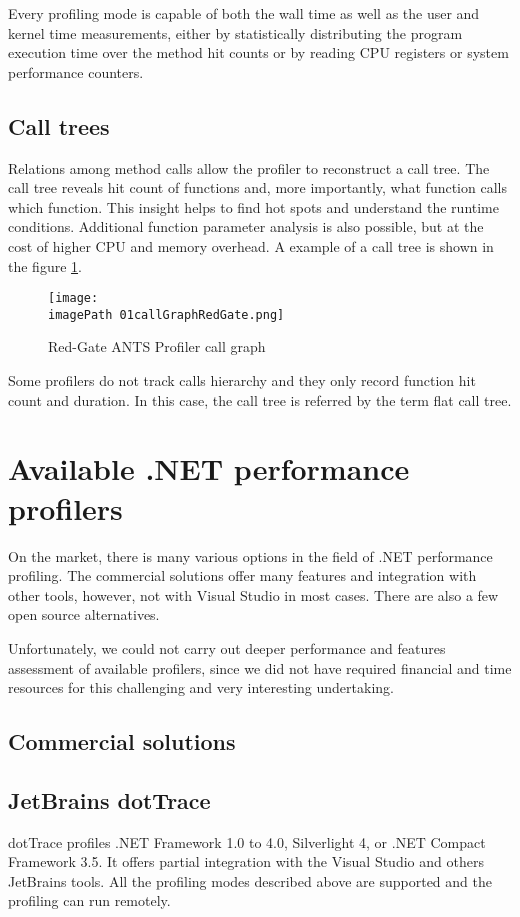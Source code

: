 Every profiling mode is capable of both the wall time as well as the user and kernel time measurements, either by statistically distributing the program execution time over the method hit counts or by reading CPU registers or system performance counters.

\subsection{Call trees}
Relations among method calls allow the profiler to reconstruct a call tree. The call tree reveals hit count of functions and, more importantly, what function calls which function. This insight helps to find hot spots and understand the runtime conditions.
Additional function parameter analysis is also possible, but at the cost of higher CPU and memory overhead. A example of a call tree is shown in the figure \ref{fig:01callGraphRedGate}.

\begin{figure}
	\centering
		\texttt{[image: \\imagePath 01callGraphRedGate.png]}
		\caption{Red-Gate ANTS Profiler call graph}
	\label{fig:01callGraphRedGate}
\end{figure}

Some profilers do not track calls hierarchy and they only record function hit count and duration. In this case, the call tree is referred by the term flat call tree.

\section{Available .NET performance profilers}
On the market, there is many various options in the field of .NET performance profiling. The commercial solutions offer many features and integration with other tools, however, not with Visual Studio in most cases. There are also a few open source alternatives.

Unfortunately, we could not carry out deeper performance and features assessment of available profilers, since we did not have required financial and time resources for this challenging and very interesting undertaking.

\subsection*{Commercial solutions}

\subsection{JetBrains dotTrace}
dotTrace profiles .NET Framework 1.0 to 4.0, Silverlight 4, or .NET Compact Framework 3.5. It offers partial integration with the Visual Studio and others JetBrains tools. All the profiling modes described above are supported and the profiling can run remotely.

